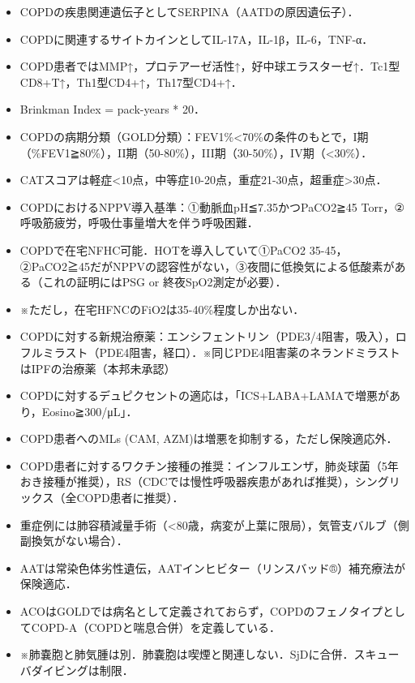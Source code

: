 \begin{itemize}
\item COPDの疾患関連遺伝子としてSERPINA（AATDの原因遺伝子）．
\item COPDに関連するサイトカインとしてIL-17A，IL-1β，IL-6，TNF-α．
\item COPD患者ではMMP↑，プロテアーゼ活性↑，好中球エラスターゼ↑．Tc1型CD8+T↑，Th1型CD4+↑，Th17型CD4+↑．
\item Brinkman Index = pack-years * 20．
\item COPDの病期分類（GOLD分類）：FEV1\%<70\%の条件のもとで，I期（\%FEV1≧80\%），II期（50-80\%），III期（30-50\%），IV期（<30\%）．
\item CATスコアは軽症<10点，中等症10-20点，重症21-30点，超重症>30点．


\item COPDにおけるNPPV導入基準：①動脈血pH≦7.35かつPaCO2≧45 Torr，②呼吸筋疲労，呼吸仕事量増大を伴う呼吸困難．
\item COPDで在宅NFHC可能．HOTを導入していて①PaCO2 35-45，②PaCO2≧45だがNPPVの認容性がない，③夜間に低換気による低酸素がある（これの証明にはPSG or 終夜SpO2測定が必要）．
\item ※ただし，在宅HFNCのFiO2は35-40\%程度しか出ない．
\item COPDに対する新規治療薬：エンシフェントリン（PDE3/4阻害，吸入），ロフルミラスト（PDE4阻害，経口）．※同じPDE4阻害薬のネランドミラストはIPFの治療薬（本邦未承認）
\item COPDに対するデュピクセントの適応は，「ICS+LABA+LAMAで増悪があり，Eosino≧300/μL」．
\item COPD患者へのMLs (CAM, AZM)は増悪を抑制する，ただし保険適応外．
\item COPD患者に対するワクチン接種の推奨：インフルエンザ，肺炎球菌（5年おき接種が推奨），RS（CDCでは慢性呼吸器疾患があれば推奨），シングリックス（全COPD患者に推奨）．
\item 重症例には肺容積減量手術（<80歳，病変が上葉に限局），気管支バルブ（側副換気がない場合）．
\item AATは常染色体劣性遺伝，AATインヒビター（リンスバッド®）補充療法が保険適応．
\item ACOはGOLDでは病名として定義されておらず，COPDのフェノタイプとしてCOPD-A（COPDと喘息合併）を定義している．
\item ※肺嚢胞と肺気腫は別．肺嚢胞は喫煙と関連しない．SjDに合併．スキューバダイビングは制限．

\end{itemize}

